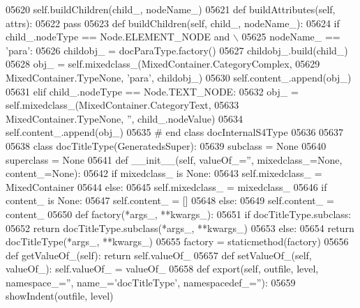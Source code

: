 \begin{DoxyCode}
{{{{{{{{{{{{{{{{{{{{{{{{{{{{{{{{{{{{{{{{{{{{{{{{{{{{{{{{{{{{{{{{{{{{{{{{{{{{{{{{{{{{{{{{{{{{{{{{{{{{{{{{{{{{{{{{{{{{{{{{{{{{{{{{{{{{{{{{{{{{{{{{{{{{{{{{{{{{{{{{{{{{{{{{{{{{{{{{{{{{{{{{{{{{{{{{{{{{{{{{{{{{{{{{{{{{{{{{{{{{{{{{{{{{{{{{{{{{{{{{{{{{{{{{{{{{{{{{{{{{{{{{{{{{{{{{{{{{{{{{{{{{{{{{{{{{{{{{{{{{{{{{{{{{{{{{{{{{{{{{{{{{{{{{{{{{{{{{{{{{{{{{{{05620             self.buildChildren(child\_, nodeName\_)
05621     \textcolor{keyword}{def }buildAttributes(self, attrs):
05622         \textcolor{keywordflow}{pass}
05623     \textcolor{keyword}{def }buildChildren(self, child\_, nodeName\_):
05624         \textcolor{keywordflow}{if} child\_.nodeType == Node.ELEMENT\_NODE \textcolor{keywordflow}{and} \(\backslash\)
05625             nodeName\_ == \textcolor{stringliteral}{'para'}:
05626             childobj\_ = docParaType.factory()
05627             childobj\_.build(child\_)
05628             obj\_ = self.mixedclass\_(MixedContainer.CategoryComplex,
05629                 MixedContainer.TypeNone, \textcolor{stringliteral}{'para'}, childobj\_)
05630             self.content\_.append(obj\_)
05631         \textcolor{keywordflow}{elif} child\_.nodeType == Node.TEXT\_NODE:
05632             obj\_ = self.mixedclass\_(MixedContainer.CategoryText,
05633                 MixedContainer.TypeNone, \textcolor{stringliteral}{''}, child\_.nodeValue)
05634             self.content\_.append(obj\_)
05635 \textcolor{comment}{# end class docInternalS4Type}
05636 
05637 
05638 \textcolor{keyword}{class }docTitleType(GeneratedsSuper):
05639     subclass = \textcolor{keywordtype}{None}
05640     superclass = \textcolor{keywordtype}{None}
05641     \textcolor{keyword}{def }__init__(self, valueOf\_='', mixedclass\_=None, content\_=None):
05642         \textcolor{keywordflow}{if} mixedclass\_ \textcolor{keywordflow}{is} \textcolor{keywordtype}{None}:
05643             self.mixedclass_ = MixedContainer
05644         \textcolor{keywordflow}{else}:
05645             self.mixedclass_ = mixedclass\_
05646         \textcolor{keywordflow}{if} content\_ \textcolor{keywordflow}{is} \textcolor{keywordtype}{None}:
05647             self.content_ = []
05648         \textcolor{keywordflow}{else}:
05649             self.content_ = content\_
05650     \textcolor{keyword}{def }factory(*args\_, **kwargs\_):
05651         \textcolor{keywordflow}{if} docTitleType.subclass:
05652             \textcolor{keywordflow}{return} docTitleType.subclass(*args\_, **kwargs\_)
05653         \textcolor{keywordflow}{else}:
05654             \textcolor{keywordflow}{return} docTitleType(*args\_, **kwargs\_)
05655     factory = staticmethod(factory)
05656     \textcolor{keyword}{def }getValueOf_(self): \textcolor{keywordflow}{return} self.valueOf\_
05657     \textcolor{keyword}{def }setValueOf_(self, valueOf\_): self.valueOf\_ = valueOf\_
05658     \textcolor{keyword}{def }export(self, outfile, level, namespace\_='', name\_='docTitleType', namespacedef\_=''):
05659         showIndent(outfile, level)
}}}}}}}}}}}}}}}}}}}}}}}}}}}}}}}}}}}}}}}}}}}}}}}}}}}}}}}}}}}}}}}}}}}}}}}}}}}}}}}}}}}}}}}}}}}}}}}}}}}}}}}}}}}}}}}}}}}}}}}}}}}}}}}}}}}}}}}}}}}}}}}}}}}}}}}}}}}}}}}}}}}}}}}}}}}}}}}}}}}}}}}}}}}}}}}}}}}}}}}}}}}}}}}}}}}}}}}}}}}}}}}}}}}}}}}}}}}}}}}}}}}}}}}}}}}}}}}}}}}}}}}}}}}}}}}}}}}}}}}}}}}}}}}}}}}}}}}}}}}}}}}}}}}}}}}}}}}}}}}}}}}}}}}}}}}}}}}}}}}}}}}}}}
\end{DoxyCode}
